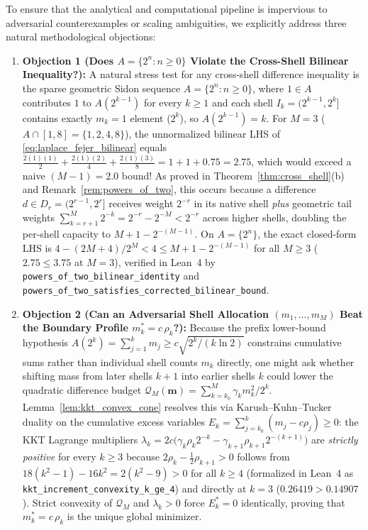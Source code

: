 \documentclass[11pt,reqno]{amsart}
\theoremstyle{definition}
\theoremstyle{remark}
\begin{document}
To ensure that the analytical and computational pipeline is impervious to adversarial counterexamples or scaling ambiguities, we explicitly address three natural methodological objections:
\begin{enumerate}
  \item \textbf{Objection 1 (Does $A = \{2^n : n \ge 0\}$ Violate the Cross-Shell Bilinear Inequality?):} A natural stress test for any cross-shell difference inequality is the sparse geometric Sidon sequence $A = \{2^n : n \ge 0\}$, where $1 \in A$ contributes $1$ to $A(2^{k-1})$ for every $k \ge 1$ and each shell $I_k = (2^{k-1}, 2^k]$ contains exactly $m_k = 1$ element ($2^k$), so $A(2^{k-1}) = k$. For $M = 3$ ($A \cap [1, 8] = \{1, 2, 4, 8\}$), the unnormalized bilinear LHS of \eqref{eq:laplace_fejer_bilinear} equals $\frac{2(1)(1)}{2} + \frac{2(1)(2)}{4} + \frac{2(1)(3)}{8} = 1 + 1 + 0.75 = 2.75$, which would exceed a naive $(M-1) = 2.0$ bound! As proved in Theorem~\ref{thm:cross_shell}(b) and Remark~\ref{rem:powers_of_two}, this occurs because a difference $d \in D_r = (2^{r-1}, 2^r]$ receives weight $2^{-r}$ in its native shell \emph{plus} geometric tail weights $\sum_{k=r+1}^M 2^{-k} = 2^{-r} - 2^{-M} < 2^{-r}$ across higher shells, doubling the per-shell capacity to $M + 1 - 2^{-(M-1)}$. On $A = \{2^n\}$, the exact closed-form LHS is $4 - (2M + 4)/2^M < 4 \le M + 1 - 2^{-(M-1)}$ for all $M \ge 3$ ($2.75 \le 3.75$ at $M = 3$), verified in Lean~4 by \texttt{powers\_of\_two\_bilinear\_identity} and \texttt{powers\_of\_two\_satisfies\_corrected\_bilinear\_bound}.
  \item \textbf{Objection 2 (Can an Adversarial Shell Allocation $(m_1, \dots, m_M)$ Beat the Boundary Profile $m_k^* = c\,\rho_k$?):} Because the prefix lower-bound hypothesis $A(2^k) = \sum_{j=1}^k m_j \ge c\sqrt{2^k / (k \ln 2)}$ constrains cumulative sums rather than individual shell counts $m_k$ directly, one might ask whether shifting mass from later shells $k+1$ into earlier shells $k$ could lower the quadratic difference budget $\mathcal{Q}_M(\bm{m}) = \sum_{k=k_0}^M \gamma_k m_k^2 / 2^k$. Lemma~\ref{lem:kkt_convex_cone} resolves this via Karush--Kuhn--Tucker duality on the cumulative excess variables $E_k = \sum_{j=k_0}^k (m_j - c\rho_j) \ge 0$: the KKT Lagrange multipliers $\lambda_k = 2c\bigl(\gamma_k \rho_k 2^{-k} - \gamma_{k+1} \rho_{k+1} 2^{-(k+1)}\bigr)$ are \emph{strictly positive} for every $k \ge 3$ because $2\rho_k - \frac{1}{2}\rho_{k+1} > 0$ follows from $18(k^2 - 1) - 16k^2 = 2(k^2 - 9) > 0$ for all $k \ge 4$ (formalized in Lean~4 as \texttt{kkt\_increment\_convexity\_k\_ge\_4}) and directly at $k = 3$ ($0.26419 > 0.14907$). Strict convexity of $\mathcal{Q}_M$ and $\lambda_k > 0$ force $E_k^* = 0$ identically, proving that $m_k^* = c\,\rho_k$ is the unique global minimizer.

\end{enumerate}
\end{document}
